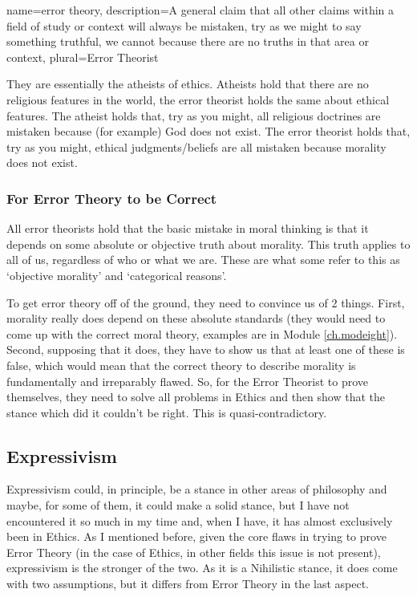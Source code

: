 {
  name=error theory,
  description={A general claim that all other claims within a field of study or context will always be mistaken, try as we might to say something truthful, we cannot because there are no truths in that area or context},
plural=Error Theorist
}


They are essentially the atheists of ethics. Atheists hold that there are no religious features in the world, the error theorist holds the same about ethical features. The atheist holds that, try as you might, all religious doctrines are mistaken because (for example) God does not exist. The error theorist holds that, try as you might, ethical judgments/beliefs are all mistaken because morality does not exist.

\subsubsection{For Error Theory to be Correct}

All error theorists hold that the basic mistake in moral thinking is that it depends on some absolute or objective truth about morality. This truth applies to all of us, regardless of who or what we are. These are what some refer to this as ‘objective morality’ and ‘categorical reasons’.

To get error theory off of the ground, they need to convince us of 2 things. First, morality really does depend on these absolute standards (they would need to come up with the correct moral theory, examples are in Module \ref{ch.modeight}). Second, supposing that it does, they have to show us that at least one of these is false, which would mean that the correct theory to describe morality is fundamentally and irreparably flawed. So, for the Error Theorist to prove themselves, they need to solve all problems in Ethics and then show that the stance which did it couldn't be right. This is quasi-contradictory.

\subsection{Expressivism}

Expressivism could, in principle, be a stance in other areas of philosophy and maybe, for some of them, it could make a solid stance, but I have not encountered it so much in my time and, when I have, it has almost exclusively been in Ethics. As I mentioned before, given the core flaws in trying to prove Error Theory (in the case of Ethics, in other fields this issue is not present), 
\Gls{expressivism} is the stronger of the two. As it is a Nihilistic stance, it does come with two assumptions, but it differs from Error Theory in the last aspect.

